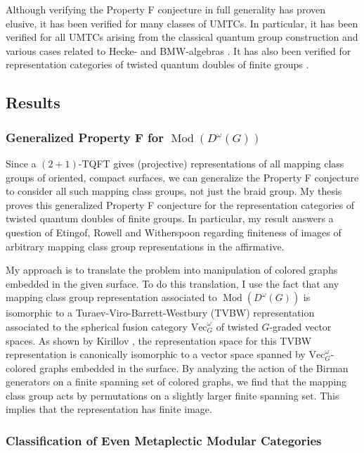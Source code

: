 \documentclass[12pt]{article}
\DeclareMathOperator{\Mod}{Mod}
\theoremstyle{plain} \numberwithin{equation}{section}
\theoremstyle{definition}
\begin{document}
Although verifying the Property F conjecture in full generality has proven elusive, it has been verified for many classes of UMTCs.  In particular, it has been verified for all UMTCs arising from the classical quantum group construction and various cases related to Hecke- and BMW-algebras \cite{FRW, flw, jones86, jonescmp, LRW, r, rw}.  It has also been verified for representation categories of twisted quantum doubles of finite groups \cite{erw}.

\subsection*{Results}
\subsubsection*{Generalized Property F for $\Mod(D^\omega(G))$}

Since a $(2+1)$-TQFT gives (projective) representations of all mapping class groups of oriented, compact surfaces, we can generalize the Property F conjecture to consider all such mapping class groups, not just the braid group. My thesis proves this generalized Property F conjecture for the representation categories of twisted quantum doubles of finite groups.  In particular, my result answers a question of Etingof, Rowell and Witherspoon \cite{erw} regarding finiteness of images of arbitrary mapping class group representations in the affirmative.

My approach is to translate the problem into manipulation of colored graphs embedded in the given surface. To do this translation, I use the fact that any mapping class group representation associated to $\Mod(D^\omega(G))$ is isomorphic to a Turaev-Viro-Barrett-Westbury (TVBW) representation \cite{bw} associated to the spherical fusion category $\text{Vec}_G^\omega$ of twisted $G$-graded vector spaces. As shown by Kirillov \cite{k}, the representation space for this TVBW representation is canonically isomorphic to a vector space spanned by $\text{Vec}_G^\omega$-colored graphs embedded in the surface. By analyzing the action of the Birman generators \cite{birman} on a finite spanning set of colored graphs, we find that the mapping class group acts by permutations on a slightly larger finite spanning set. This implies that the representation has finite image.

\subsubsection*{Classification of Even Metaplectic Modular Categories}
\end{document}
